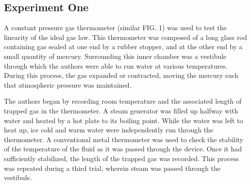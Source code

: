 \documentclass[%
 aip,
 jmp,%
 amsmath,amssymb,
 reprint,%
]{revtex4-1}
\begin{document}
  \subsection{Experiment One}
  A constant pressure gas thermometer (similar FIG. 1) was used to test the linearity of the ideal gas law. This thermometer was composed of a long glass rod containing gas sealed at one end by a rubber stopper, and at the other end by a small quantity of mercury. Surrounding this inner chamber was a vestibule through which the authors were able to run water at various temperatures. During this process, the gas expanded or contracted, moving the mercury such that atmospheric pressure was maintained.

  The authors began by recording room temperature and the associated length of trapped gas in the thermometer. A steam generator was filled up halfway with water and heated by a hot plate to its boiling point. While the water was left to heat up, ice cold and warm water were independently run through the thermometer. A conventional metal thermometer was used to check the stability of the temperature of the fluid as it was passed through the device. Once it had sufficiently stabilized, the length of the trapped gas was recorded. This process was repeated during a third trial, wherein steam was passed through the vestibule.
\end{document}
